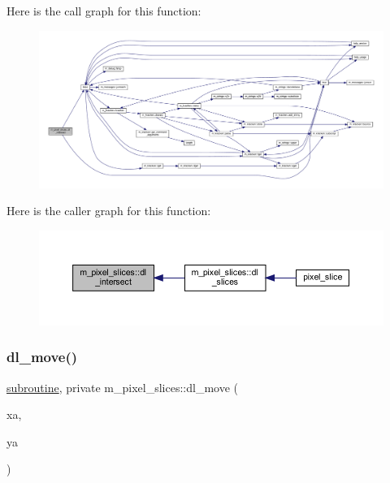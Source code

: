 Here is the call graph for this function\+:
\nopagebreak
\begin{figure}[H]
\begin{center}
\leavevmode
\includegraphics[width=350pt]{namespacem__pixel__slices_a1508683ec3b2444091bb34d40b5d8b93_cgraph}
\end{center}
\end{figure}
Here is the caller graph for this function\+:
\nopagebreak
\begin{figure}[H]
\begin{center}
\leavevmode
\includegraphics[width=350pt]{namespacem__pixel__slices_a1508683ec3b2444091bb34d40b5d8b93_icgraph}
\end{center}
\end{figure}
\mbox{\label{namespacem__pixel__slices_ab9e9530d7fb4fbea1bc5d52744498731}} 
\subsubsection{\texorpdfstring{dl\+\_\+move()}{dl\_move()}}
{\footnotesize\ttfamily \hyperlink{M__stopwatch_83_8txt_acfbcff50169d691ff02d4a123ed70482}{subroutine}, private m\+\_\+pixel\+\_\+slices\+::dl\+\_\+move (\begin{DoxyParamCaption}\item[{}]{xa,  }\item[{}]{ya }\end{DoxyParamCaption})\hspace{0.3cm}{\ttfamily [private]}}



